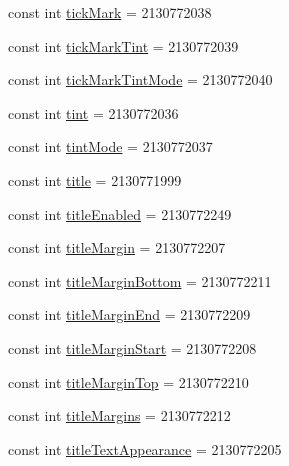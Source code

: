 \begin{DoxyCompactItemize}
\item 
const int \mbox{\hyperlink{class_f_w_p_s___app_1_1_droid_1_1_resource_1_1_attribute_a1d0ac72c800997ae9c39535f44e0d6f8}{tick\+Mark}} = 2130772038
\item 
const int \mbox{\hyperlink{class_f_w_p_s___app_1_1_droid_1_1_resource_1_1_attribute_adad340f3cddbdc7698f261c6e397ed2c}{tick\+Mark\+Tint}} = 2130772039
\item 
const int \mbox{\hyperlink{class_f_w_p_s___app_1_1_droid_1_1_resource_1_1_attribute_a333e8c422dfd35f790b9c89327b516eb}{tick\+Mark\+Tint\+Mode}} = 2130772040
\item 
const int \mbox{\hyperlink{class_f_w_p_s___app_1_1_droid_1_1_resource_1_1_attribute_a193c02755f6c6f58ae2d58a3b550868b}{tint}} = 2130772036
\item 
const int \mbox{\hyperlink{class_f_w_p_s___app_1_1_droid_1_1_resource_1_1_attribute_ad6b6ba0b076590582cd30bb9fc970ffa}{tint\+Mode}} = 2130772037
\item 
const int \mbox{\hyperlink{class_f_w_p_s___app_1_1_droid_1_1_resource_1_1_attribute_a0262b0fdcc81568fbbc8728c21c232d5}{title}} = 2130771999
\item 
const int \mbox{\hyperlink{class_f_w_p_s___app_1_1_droid_1_1_resource_1_1_attribute_a937b49b170dbf7255977a52acb0b34c6}{title\+Enabled}} = 2130772249
\item 
const int \mbox{\hyperlink{class_f_w_p_s___app_1_1_droid_1_1_resource_1_1_attribute_afc100bd7d4c3515ed95563679f600354}{title\+Margin}} = 2130772207
\item 
const int \mbox{\hyperlink{class_f_w_p_s___app_1_1_droid_1_1_resource_1_1_attribute_afe9933a25eb852384f29c8fdfbc2e552}{title\+Margin\+Bottom}} = 2130772211
\item 
const int \mbox{\hyperlink{class_f_w_p_s___app_1_1_droid_1_1_resource_1_1_attribute_a2b436607320cf874581fb0b10d27da2d}{title\+Margin\+End}} = 2130772209
\item 
const int \mbox{\hyperlink{class_f_w_p_s___app_1_1_droid_1_1_resource_1_1_attribute_a5eb08420e67321957bd0ec6deebe21eb}{title\+Margin\+Start}} = 2130772208
\item 
const int \mbox{\hyperlink{class_f_w_p_s___app_1_1_droid_1_1_resource_1_1_attribute_ab3f47029ae01b42a26bb23278d5f3d04}{title\+Margin\+Top}} = 2130772210
\item 
const int \mbox{\hyperlink{class_f_w_p_s___app_1_1_droid_1_1_resource_1_1_attribute_ae523afde0ef5aef64825c4072131e7c7}{title\+Margins}} = 2130772212
\item 
const int \mbox{\hyperlink{class_f_w_p_s___app_1_1_droid_1_1_resource_1_1_attribute_af357b386532a3bdef74c291cd0542c32}{title\+Text\+Appearance}} = 2130772205

\end{DoxyCompactItemize}
